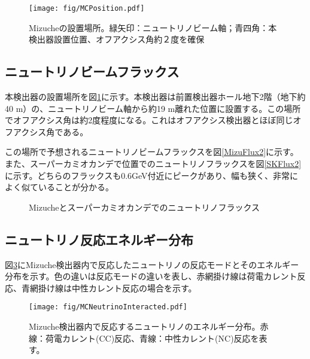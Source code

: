 \documentclass[11pt]{ltjsreport}
\newcommand{\figref}[1]{図\ref{#1}}
\begin{document}
\begin{figure}[htbp]
\centering
\texttt{[image: fig/MCPosition.pdf]}
\caption[Mizucheの設置場所]{Mizucheの設置場所。緑矢印：ニュートリノビーム軸；青四角：本検出器設置位置、オフアクシス角約２度を確保}
\label{MCPosition}
\end{figure}

\subsection{ニュートリノビームフラックス}
本検出器の設置場所を\figref{MCPosition}に示す。本検出器は前置検出器ホール地下2階（地下約40 m）の、ニュートリノビーム軸から約19 m離れた位置に設置する。この場所でオフアクシス角は約2度程度になる。これはオフアクシス検出器とほぼ同じオフアクシス角である。

この場所で予想されるニュートリノビームフラックスを\figref{MizuFlux2}に示す。また、スーパーカミオカンデで位置でのニュートリノフラックスを\figref{SKFlux2}に示す。どちらのフラックスも0.6GeV付近にピークがあり、幅も狭く、非常によく似ていることが分かる。

\begin{figure}[htbp]
  \begin{minipage}{0.47\textwidth}
  \end{minipage}
  \hfill
  \begin{minipage}{0.47\textwidth}
  \end{minipage}
    \caption[Mizucheとスーパーカミオカンデでのニュートリノフラックス]{Mizucheとスーパーカミオカンデでのニュートリノフラックス}
  \label{MizuSKFlux2}
\end{figure}

\subsection{ニュートリノ反応エネルギー分布}

\figref{MCNeutrinoInteracted}にMizuche検出器内で反応したニュートリノの反応モードとそのエネルギー分布を示す。色の違いは反応モードの違いを表し、赤網掛け線は荷電カレント反応、青網掛け線は中性カレント反応の場合を示す。

\begin{figure}[htbp]
\centering
\texttt{[image: fig/MCNeutrinoInteracted.pdf]}
\caption[Mizuche検出器内で反応するニュートリノのエネルギー分布]{Mizuche検出器内で反応するニュートリノのエネルギー分布。赤線：荷電カレント(CC)反応、青線：中性カレント(NC)反応を表す。}
\label{MCNeutrinoInteracted}
\end{figure}
\end{document}
